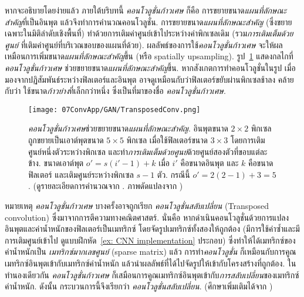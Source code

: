 หากจะอธิบายโดยง่ายแล้ว 
ภายใต้บริบทนี้
\textit{คอนโวลูชั่นก้าวเศษ}%
ก็คือ การขยายขนาด\textit{แผนที่ลักษณะสำคัญ}ที่เป็นอินพุต แล้วจึงทำการคำนวณคอนโวลูชั่น.
การขยายขนาด\textit{แผนที่ลักษณะสำคัญ} (ซึ่งขยายเฉพาะในมิติลำดับเชิงพื้นที่) 
ทำด้วยการเติมค่าศูนย์เข้าไประหว่างค่าพิกเซลเดิม (รวม\textit{การเติมเต็มด้วยศูนย์} ที่เติมค่าศูนย์ที่บริเวณขอบของแผนที่ด้วย).
%
ผลลัพธ์ของการใช้\textit{คอนโวลูชั่นก้าวเศษ} จะให้ผลเหมือนการเพิ่มขนาด\textit{แผนที่ลักษณะสำคัญ}ขึ้น (หรือ spatially upsampling).
รูป~\ref{fig: conv app fractionally strided convolution} 
แสดงกลไกที่\textit{คอนโวลูชั่นก้าวเศษ} ช่วยขยายขนาด\textit{แผนที่ลักษณะสำคัญ}ขึ้น.
หากสังเกตการทำคอนโวลูชั่นในรูป 
เมื่อมองจากปฏิสัมพันธ์ระหว่างฟิลเตอร์และอินพุต 
อาจดูเหมือนกับว่าฟิลเตอร์ขยับผ่านพิกเซลช้าลง คล้ายกับว่า ใช้ขนาด\textit{ก้าวย่าง}ที่เล็กกว่าหนึ่ง ซึ่งเป็นที่มาของชื่อ \textit{คอนโวลูชั่นก้าวเศษ}.

%
\begin{figure}
	\begin{center}
	\texttt{[image: 07ConvApp/GAN/TransposedConv.png]}
\caption[คอนโวลูชั่นก้าวเศษช่วยขยายขนาดแผนที่ลักษณะสำคัญ]{\textit{คอนโวลูชั่นก้าวเศษ}ช่วยขยายขนาด\textit{แผนที่ลักษณะสำคัญ}.
อินพุตขนาด $2 \times 2$ พิกเซล ถูกขยายเป็นเอาต์พุตขนาด $5 \times 5$ พิกเซล เมื่อใช้ฟิลเตอร์ขนาด $3 \times 3$ โดยการเติมศูนย์หนึ่งตัวระหว่างพิกเซล 
และทำ\textit{การเติมเต็มด้วยศูนย์}ด้วยศูนย์สองตัวที่ขอบแต่ละข้าง.
ขนาดเอาต์พุต $o' = s (i' - 1) + k$ เมื่อ $i'$ คือขนาดอินพุต และ $k$ คือขนาดฟิลเตอร์ และเติมศูนย์ระหว่างพิกเซล $s - 1$ ตัว. 
กรณีนี้ $o' = 2 (2 - 1) + 3 = 5$.
(ดูรายละเอียดการคำนวณจาก \cite{DumoulinVisin2018}. ภาพดัดแปลงจาก \cite[รูป 4.5]{DumoulinVisin2018})}
		\label{fig: conv app fractionally strided convolution}
	\end{center}
\end{figure}
%


หมายเหตุ
\textit{คอนโวลูชั่นก้าวเศษ} บางครั้งอาจถูกเรียก \textit{คอนโวลูชั่นสลับเปลี่ยน} (Transposed convolution) ซึ่งมาจากการตีความทางคณิตศาสตร์.
นั่นคือ 
หากดำเนินคอนโวลูชั่นด้วยการแปลงอินพุตและค่าน้ำหนักของฟิลเตอร์เป็นเมทริกซ์ โดยจัดรูปเมทริกซ์ทั้งสองให้ถูกต้อง (มีการใช้ค่าซ้ำและมีการเติมศูนย์เข้าไป ดูแบบฝึกหัด~\ref{ex: CNN implementation} ประกอบ) ซึ่งทำให้ได้เมทริกซ์ของค่าน้ำหนักเป็น \textit{เมทริกซ์มากเลขศูนย์} (sparse matrix) แล้ว
การทำ\textit{คอนโวลูชั่น} ก็เหมือนกับการคูณเมทริกซ์อินพุตเข้ากับเมทริกซ์ค่าน้ำหนัก แล้วนำผลลัพธ์ที่ได้ไปจัดรูปให้เข้ากับโครงสร้างที่ถูกต้อง.
ในทำนองเดียวกัน \textit{คอนโวลูชั่นก้าวเศษ} ก็เสมือนการคูณเมทริกซ์อินพุตเข้ากับ\textit{การสลับเปลี่ยน}ของเมทริกซ์ค่าน้ำหนัก.
ดังนั้น กระบวนการนี้จึงเรียกว่า \textit{คอนโวลูชั่นสลับเปลี่ยน}.
(ศึกษาเพิ่มเติมได้จาก \cite{DumoulinVisin2018})

